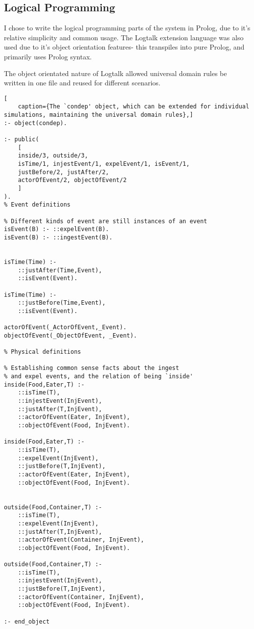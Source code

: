 \documentclass[report]{subfiles}
\begin{document}
\subsection{Logical Programming}
I chose to write the logical programming parts of the system in Prolog, due to it's relative simplicity and common usage. The Logtalk extension language was also used due to it's object orientation features- this transpiles into pure Prolog, and primarily uses Prolog syntax.

The object orientated nature of Logtalk allowed universal domain rules be written in one file and reused for different scenarios. 




\begin{lstlisting}[
    caption={The `condep' object, which can be extended for individual simulations, maintaining the universal domain rules},]
:- object(condep).

:- public(
    [
    inside/3, outside/3,
    isTime/1, injestEvent/1, expelEvent/1, isEvent/1,
    justBefore/2, justAfter/2,
    actorOfEvent/2, objectOfEvent/2
    ]
).
% Event definitions

% Different kinds of event are still instances of an event
isEvent(B) :- ::expelEvent(B).
isEvent(B) :- ::ingestEvent(B).


isTime(Time) :-
    ::justAfter(Time,Event),
    ::isEvent(Event).

isTime(Time) :-
    ::justBefore(Time,Event),
    ::isEvent(Event).

actorOfEvent(_ActorOfEvent,_Event).
objectOfEvent(_ObjectOfEvent, _Event).

% Physical definitions

% Establishing common sense facts about the ingest
% and expel events, and the relation of being `inside'
inside(Food,Eater,T) :-
    ::isTime(T),
    ::injestEvent(InjEvent),
    ::justAfter(T,InjEvent),
    ::actorOfEvent(Eater, InjEvent),
    ::objectOfEvent(Food, InjEvent).

inside(Food,Eater,T) :-
    ::isTime(T),
    ::expelEvent(InjEvent),
    ::justBefore(T,InjEvent),
    ::actorOfEvent(Eater, InjEvent),
    ::objectOfEvent(Food, InjEvent).


outside(Food,Container,T) :-
    ::isTime(T),
    ::expelEvent(InjEvent),
    ::justAfter(T,InjEvent),
    ::actorOfEvent(Container, InjEvent),
    ::objectOfEvent(Food, InjEvent).

outside(Food,Container,T) :-
    ::isTime(T),
    ::injestEvent(InjEvent),
    ::justBefore(T,InjEvent),
    ::actorOfEvent(Container, InjEvent),
    ::objectOfEvent(Food, InjEvent).

:- end_object
    
\end{lstlisting}
\end{document}

